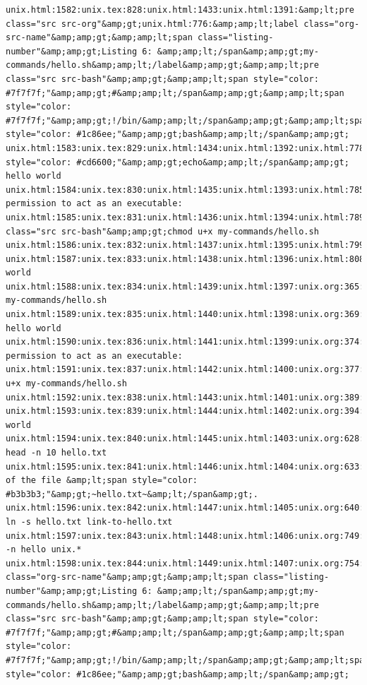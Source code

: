 \documentclass[11pt]{article}
\begin{document}
\begin{verbatim}
unix.html:1582:unix.tex:828:unix.html:1433:unix.html:1391:&amp;lt;pre class="src src-org"&amp;gt;unix.html:776:&amp;amp;lt;label class="org-src-name"&amp;amp;gt;&amp;amp;lt;span class="listing-number"&amp;amp;gt;Listing 6: &amp;amp;lt;/span&amp;amp;gt;my-commands/hello.sh&amp;amp;lt;/label&amp;amp;gt;&amp;amp;lt;pre class="src src-bash"&amp;amp;gt;&amp;amp;lt;span style="color: #7f7f7f;"&amp;amp;gt;#&amp;amp;lt;/span&amp;amp;gt;&amp;amp;lt;span style="color: #7f7f7f;"&amp;amp;gt;!/bin/&amp;amp;lt;/span&amp;amp;gt;&amp;amp;lt;span style="color: #1c86ee;"&amp;amp;gt;bash&amp;amp;lt;/span&amp;amp;gt;
unix.html:1583:unix.tex:829:unix.html:1434:unix.html:1392:unix.html:778:&amp;amp;lt;span style="color: #cd6600;"&amp;amp;gt;echo&amp;amp;lt;/span&amp;amp;gt; hello world
unix.html:1584:unix.tex:830:unix.html:1435:unix.html:1393:unix.html:785:"hello.sh" permission to act as an executable:
unix.html:1585:unix.tex:831:unix.html:1436:unix.html:1394:unix.html:789:&amp;amp;lt;pre class="src src-bash"&amp;amp;gt;chmod u+x my-commands/hello.sh
unix.html:1586:unix.tex:832:unix.html:1437:unix.html:1395:unix.html:799:hello.sh
unix.html:1587:unix.tex:833:unix.html:1438:unix.html:1396:unix.html:808:hello world
unix.html:1588:unix.tex:834:unix.html:1439:unix.html:1397:unix.org:365:#+CAPTION: my-commands/hello.sh
unix.html:1589:unix.tex:835:unix.html:1440:unix.html:1398:unix.org:369:echo hello world
unix.html:1590:unix.tex:836:unix.html:1441:unix.html:1399:unix.org:374:"hello.sh" permission to act as an executable:
unix.html:1591:unix.tex:837:unix.html:1442:unix.html:1400:unix.org:377:chmod u+x my-commands/hello.sh
unix.html:1592:unix.tex:838:unix.html:1443:unix.html:1401:unix.org:389:hello.sh
unix.html:1593:unix.tex:839:unix.html:1444:unix.html:1402:unix.org:394:hello world
unix.html:1594:unix.tex:840:unix.html:1445:unix.html:1403:unix.org:628:      head -n 10 hello.txt
unix.html:1595:unix.tex:841:unix.html:1446:unix.html:1404:unix.org:633:    of the file &amp;lt;span style="color: #b3b3b3;"&amp;gt;~hello.txt~&amp;lt;/span&amp;gt;.
unix.html:1596:unix.tex:842:unix.html:1447:unix.html:1405:unix.org:640:      ln -s hello.txt link-to-hello.txt
unix.html:1597:unix.tex:843:unix.html:1448:unix.html:1406:unix.org:749:grep -n hello unix.*
unix.html:1598:unix.tex:844:unix.html:1449:unix.html:1407:unix.org:754:unix.html:776:&amp;amp;lt;label class="org-src-name"&amp;amp;gt;&amp;amp;lt;span class="listing-number"&amp;amp;gt;Listing 6: &amp;amp;lt;/span&amp;amp;gt;my-commands/hello.sh&amp;amp;lt;/label&amp;amp;gt;&amp;amp;lt;pre class="src src-bash"&amp;amp;gt;&amp;amp;lt;span style="color: #7f7f7f;"&amp;amp;gt;#&amp;amp;lt;/span&amp;amp;gt;&amp;amp;lt;span style="color: #7f7f7f;"&amp;amp;gt;!/bin/&amp;amp;lt;/span&amp;amp;gt;&amp;amp;lt;span style="color: #1c86ee;"&amp;amp;gt;bash&amp;amp;lt;/span&amp;amp;gt;

\end{verbatim}
\end{document}
